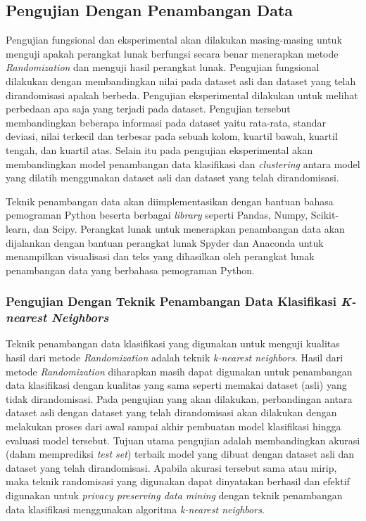 \subsection{Pengujian Dengan Penambangan Data}
\label{subsec:analisis-penambangan}

Pengujian fungsional dan eksperimental akan dilakukan masing-masing untuk menguji apakah perangkat lunak berfungsi secara benar menerapkan metode \textit{Randomization} dan menguji hasil perangkat lunak. Pengujian fungsional dilakukan dengan membandingkan nilai pada dataset asli dan dataset yang telah dirandomisasi apakah berbeda. Pengujian eksperimental dilakukan untuk melihat perbedaan apa saja yang terjadi pada dataset. Pengujian tersebut membandingkan beberapa informasi pada dataset yaitu rata-rata, standar deviasi, nilai terkecil dan terbesar pada sebuah kolom, kuartil bawah, kuartil tengah, dan kuartil atas. Selain itu pada pengujian eksperimental akan membandingkan model penambangan data klasifikasi dan \textit{clustering} antara model yang dilatih menggunakan dataset asli dan dataset yang telah dirandomisasi.

Teknik penambangan data akan diimplementasikan dengan bantuan bahasa pemograman Python beserta berbagai \textit{library} seperti Pandas, Numpy, Scikit-learn, dan Scipy. Perangkat lunak untuk menerapkan penambangan data akan dijalankan dengan bantuan perangkat lunak Spyder dan Anaconda untuk menampilkan visualisasi dan teks yang dihasilkan oleh perangkat lunak penambangan data yang berbahasa pemograman Python. 

\subsubsection{Pengujian Dengan Teknik Penambangan Data Klasifikasi \textit{K-nearest Neighbors}}
\label{subsubsec:analisis-knn}

Teknik penambangan data klasifikasi yang digunakan untuk menguji kualitas hasil dari metode \textit{Randomization} adalah teknik \textit{k-nearest neighbors}. Hasil dari metode \textit{Randomization} diharapkan masih dapat digunakan untuk penambangan data klasifikasi dengan kualitas yang sama seperti memakai dataset (asli) yang tidak dirandomisasi. Pada pengujian yang akan dilakukan, perbandingan antara dataset asli dengan dataset yang telah dirandomisasi akan dilakukan dengan melakukan proses dari awal sampai akhir pembuatan model klasifikasi hingga evaluasi model tersebut. Tujuan utama pengujian adalah membandingkan akurasi (dalam memprediksi \textit{test set}) terbaik model yang dibuat dengan dataset asli dan dataset yang telah dirandomisasi. Apabila akurasi tersebut sama atau mirip, maka teknik randomisasi yang digunakan dapat dinyatakan berhasil dan efektif digunakan untuk \textit{privacy preserving data mining} dengan teknik penambangan data klasifikasi menggunakan algoritma \textit{k-nearest neighbors}.

